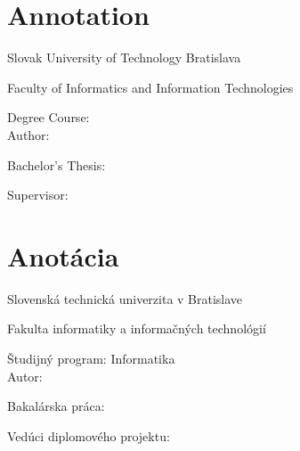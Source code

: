 
\thispagestyle{empty}

\section*{Annotation}

\begin{minipage}[t]{1\columnwidth}%
Slovak University of Technology Bratislava 

Faculty of Informatics and Information Technologies

Degree Course: \myStudyProgram\\

Author: \myName

Bachelor's Thesis: \myTitle

Supervisor: \mySupervisor

\myDate%
\end{minipage}

\bigskip{}



\newpage{}\thispagestyle{empty}

\newpage
\thispagestyle{empty}
\mbox{}
\newpage

\thispagestyle{empty}
\section*{Anotácia}

\begin{minipage}[t]{1\columnwidth}%
Slovenská technická univerzita v Bratislave

Fakulta informatiky a informačných technológií

Študijný program: Informatika\\

Autor: \myName

Bakalárska práca: \myTitle

Vedúci diplomového projektu: \mySupervisor

\myDate%
\end{minipage}

\bigskip{}



\newpage{}\thispagestyle{empty}\medskip{}


\newpage{}

\newpage
\thispagestyle{empty}
\mbox{}
\newpage

\newpage
\thispagestyle{empty}
{}
{}
\newpage


\thispagestyle{empty}
\mbox{}
\newpage

